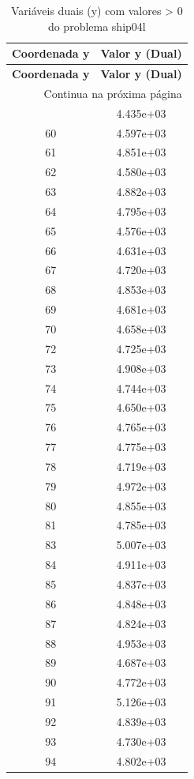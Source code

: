 \documentclass[12pt]{article}
\begin{document}
\begin{longtable}{@{}cc@{}}
\caption{Variáveis duais (y) com valores > 0 do problema ship04l} \\
\toprule
\textbf{Coordenada y} & \textbf{Valor y (Dual)} \\
\midrule
\endfirsthead

\toprule
\textbf{Coordenada y} & \textbf{Valor y (Dual)} \\
\midrule
\endhead

\midrule \multicolumn{2}{r}{{Continua na próxima página}} \\ \midrule
\endfoot

\bottomrule
\endlastfoot
59 & 4.435e+03 \\
60 & 4.597e+03 \\
61 & 4.851e+03 \\
62 & 4.580e+03 \\
63 & 4.882e+03 \\
64 & 4.795e+03 \\
65 & 4.576e+03 \\
66 & 4.631e+03 \\
67 & 4.720e+03 \\
68 & 4.853e+03 \\
69 & 4.681e+03 \\
70 & 4.658e+03 \\
72 & 4.725e+03 \\
73 & 4.908e+03 \\
74 & 4.744e+03 \\
75 & 4.650e+03 \\
76 & 4.765e+03 \\
77 & 4.775e+03 \\
78 & 4.719e+03 \\
79 & 4.972e+03 \\
80 & 4.855e+03 \\
81 & 4.785e+03 \\
83 & 5.007e+03 \\
84 & 4.911e+03 \\
85 & 4.837e+03 \\
86 & 4.848e+03 \\
87 & 4.824e+03 \\
88 & 4.953e+03 \\
89 & 4.687e+03 \\
90 & 4.772e+03 \\
91 & 5.126e+03 \\
92 & 4.839e+03 \\
93 & 4.730e+03 \\
94 & 4.802e+03 \\

\end{longtable}
\end{document}
